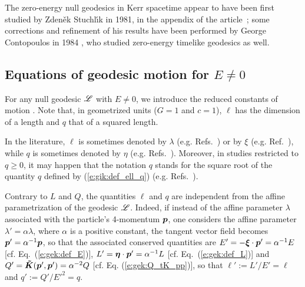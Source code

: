 \begin{hist}
The zero-energy null geodesics in Kerr spacetime appear to have been first
studied by Zden\v{e}k Stuchl\'{\i}k in 1981, in the appendix
of the article~\cite{Stuch81}; some corrections and refinement of his results have been
performed by George Contopoulos in 1984 \cite{Conto84},
who studied zero-energy timelike geodesics as well.
\end{hist}

\subsection{Equations of geodesic motion for $E\neq 0$} \label{s:gik:eom_Enonzero}

For any null geodesic $\mathscr{L}$ with $E\neq 0$, we introduce the reduced constants of motion
\be \label{e:gik:def_ell_q}
     \qand
     .
\ee
Note that, in geometrized units ($G=1$ and $c=1$), $\ell$ has the dimension of
a length and $q$ that of a squared length.

\begin{remark}
In the literature, $\ell$ is sometimes denoted by $\lambda$ (e.g. Refs.~\cite{Barde73,GrallL20b,DokucN20a})
or by $\xi$ (e.g. Ref.~\cite{Chand83}), while $q$ is sometimes denoted by
$\eta$ (e.g. Refs.~\cite{Barde73,Chand83,GrallL20b}). Moreover, in studies restricted
to $q\geq 0$, it may happen that the notation $q$ stands for the square root of the quantity $q$ defined by
(\ref{e:gik:def_ell_q}) (e.g. Refs.~\cite{DexteA09,GrallLS18,DokucN20a}).
\end{remark}

\begin{remark} \label{r:gik:ell_q_intrinsic}
Contrary to $L$ and $Q$,
the quantities $\ell$ and $q$ are independent from the affine parametrization of the geodesic $\mathscr{L}$.
Indeed, if instead of the affine parameter $\lambda$ associated with the particle's 4-momentum $\bm{p}$,
one considers the affine parameter $\lambda' = \alpha \lambda$, where $\alpha$ is a positive constant,
the tangent vector field becomes
$\bm{p}' = \alpha^{-1} \bm{p}$, so that the associated conserved
quantities are $E' = - \bm{\xi}\cdot\bm{p}' = \alpha^{-1} E$ [cf. Eq.~(\ref{e:gek:def_E})], $L' = \bm{\eta}\cdot\bm{p}' = \alpha^{-1} L$ [cf. Eq.~(\ref{e:gek:def_L})]
and $Q' = \bm{\tilde K}(\bm{p}',\bm{p}') = \alpha^{-2} Q$ [cf. Eq. (\ref{e:gek:Q_tK_pp})],
so that $\ell' := L'/E' = \ell$ and $q' := Q'/{E'}^2 = q$.
\end{remark}

